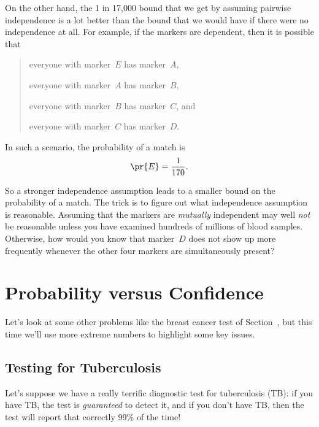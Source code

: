 On the other hand, the 1 in 17,000 bound that we get by assuming
pairwise independence is a lot better than the bound that we would
have if there were no independence at all.  For example, if the
markers are dependent, then it is possible that
\begin{quote}
everyone with marker~$E$ has marker~$A$,

everyone with marker~$A$ has marker~$B$,

everyone with marker~$B$ has marker~$C$, and

everyone with marker~$C$ has marker~$D$.
\end{quote}
In such a scenario, the probability of a match is
\begin{equation*}
    \pr{E} = \frac{1}{170}.
\end{equation*}

So a stronger independence assumption leads to a smaller bound on the
probability of a match.  The trick is to figure out what independence
assumption is reasonable.  Assuming that the markers are
\emph{mutually} independent may well \emph{not} be reasonable unless
you have examined hundreds of millions of blood samples.  Otherwise,
how would you know that marker~$D$ does not show up more frequently
whenever the other four markers are simultaneously present?

\section{Probability versus Confidence}\label{sec: Confidence_v_Prob}

\newcommand{\BF}[2]{\operatorname{Bayes-factor}(#1,#2)}
\newcommand{\testplus}{\ensuremath{\mathbf{test+}}}
\newcommand{\testminus}{\ensuremath{\mathbf{test-}}}
\newcommand{\TB}{\emph{TB}}

Let's look at some other problems like the breast cancer test of
Section~, but this time we'll use more
extreme numbers to highlight some key issues.

\subsection{Testing for Tuberculosis}

Let's suppose we have a really terrific diagnostic test for
tuberculosis (TB): if you have TB, the test is \emph{guaranteed} to
detect it, and if you don't have TB, then the test will report that
correctly 99\% of the time!

